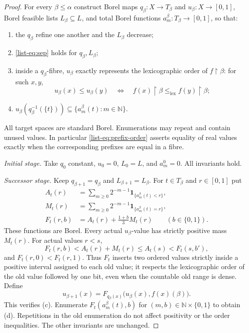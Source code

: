 \documentclass[11pt,reqno]{amsart}
\theoremstyle{plain}
\theoremstyle{definition}
\theoremstyle{remark}
\newcommand{\restr}{\mathbin{\upharpoonright}}
\newcommand{\N}{\mathbb N}
\newcommand{\lex}{\mathrm{lex}}
\newcommand{\ind}{\mathbf 1}
\begin{document}
\begin{proof}
For every $\beta\le\alpha$ construct Borel maps
$q_\beta:X\to T_\beta$ and $u_\beta:X\to[0,1]$, Borel feasible lists
$L_\beta\subseteq L$, and total Borel functions
$a_m^\beta:T_\beta\to[0,1]$, so that:
\begin{enumerate}
\item[(a)] the $q_\beta$ refine one another and the $L_\beta$ decrease;
\item[(b)] \eqref{list-eq:sep} holds for $q_\beta,L_\beta$;
\item[(c)] inside a $q_\beta$-fibre, $u_\beta$ exactly represents the
lexicographic order of $f\restr\beta$: for such $x,y$,
\begin{equation}\label{list-eq:prefix-order}
u_\beta(x)\le u_\beta(y)
\quad\Longleftrightarrow\quad
f(x)\restr\beta\le_{\lex}f(y)\restr\beta;
\end{equation}
\item[(d)]
$u_\beta(q_\beta^{-1}(\{t\}))\subseteq
\{a_m^\beta(t):m\in\N\}$.
\end{enumerate}
All target spaces are standard Borel. Enumerations may repeat and contain
unused values. In particular \eqref{list-eq:prefix-order} asserts equality of
real values exactly when the corresponding prefixes are equal in a fibre.

\smallskip
\noindent\emph{Initial stage.}
Take $q_0$ constant, $u_0=0$, $L_0=L$, and $a_m^0=0$. All invariants hold.

\smallskip
\noindent\emph{Successor stage.}
Keep $q_{\beta+1}=q_\beta$ and $L_{\beta+1}=L_\beta$.
For $t\in T_\beta$ and $r\in[0,1]$ put
\begin{align*}
A_t(r)&=\sum_{m\ge0}2^{-m-1}\ind_{\{a_m^\beta(t)<r\}},\\
M_t(r)&=\sum_{m\ge0}2^{-m-1}\ind_{\{a_m^\beta(t)=r\}},\\
F_t(r,b)&=A_t(r)+\frac{1+b}{3}M_t(r)\qquad(b\in\{0,1\}).
\end{align*}
These functions are Borel. Every actual $u_\beta$-value has strictly
positive mass $M_t(r)$. For actual values $r<s$,
\[
F_t(r,b)<A_t(r)+M_t(r)\le A_t(s)<F_t(s,b'),
\]
and $F_t(r,0)<F_t(r,1)$. Thus $F_t$ inserts two ordered values strictly
inside a positive interval assigned to each old value; it respects the
lexicographic order of the old value followed by one bit, even when the
countable old range is dense.
Define
\begin{equation*}
u_{\beta+1}(x)=F_{q_\beta(x)}\bigl(u_\beta(x),f(x)(\beta)\bigr).
\end{equation*}
This verifies (c). Enumerate
$F_t(a_m^\beta(t),b)$ for $(m,b)\in\N\times\{0,1\}$ to obtain (d).
Repetitions in the old enumeration do not affect positivity or the order
inequalities. The other invariants are unchanged.


\end{proof}
\end{document}
